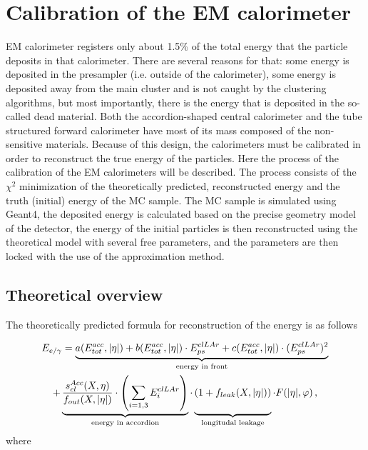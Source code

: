 \chapter{Calibration of the EM calorimeter}
\label{sec:Calibration}

EM calorimeter registers only about 1.5\% of the total energy that the particle deposits in that calorimeter. There are several reasons for that: some energy is deposited in the presampler (i.e. outside of the calorimeter), some energy is deposited away from the main cluster and is not caught by the clustering algorithms, but most importantly, there is the energy that is deposited in the so-called dead material. Both the accordion-shaped central calorimeter and the tube structured forward calorimeter have most of its mass composed of the non-sensitive materials. Because of this design, the calorimeters must be calibrated in order to reconstruct the  true energy of the particles. Here the process of the calibration of the EM calorimeters will be described. The process consists of the $\chi^{2}$ minimization of the theoretically predicted, reconstructed energy and the truth (initial) energy of the MC sample. The MC sample is simulated using Geant4, the deposited energy is calculated based on the precise geometry model of the detector, the energy of the initial particles is then reconstructed using the theoretical model with several free parameters, and the parameters are then locked with the use of the approximation method.

\section{Theoretical overview}

The theoretically predicted formula for reconstruction of the energy is as follows

\begin{equation}
\label{eq:calib_theory}
\begin{gathered}
E_{e/\gamma} = \underbrace{a(E^{acc}_{tot}, |\eta|) + b (E^{acc}_{tot}, |\eta|) \cdot E^{clLAr}_{ps} + c (E^{acc}_{tot}, |\eta|) \cdot (E^{clLAr}_{ps})^{2}}_\text{energy in front} \\
+ \underbrace{\frac{s^{Acc}_{cl}(X,\eta)}{f_{out}(X,|\eta|)} \cdot \left( \sum\limits_{i=1,3} E^{clLAr}_{i} \right)}_\text{energy in accordion}
 \cdot \underbrace{(1+f_{leak}(X,|\eta|)) \vphantom{\left( \sum\limits_{i=1,3} E^{clLAr}_{i} \right)}}_\text{longitudal leakage}
 \cdot F(|\eta|,\varphi) \,,
\end{gathered}
\end{equation}
where

